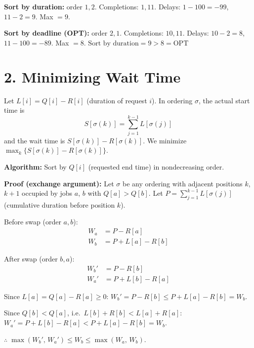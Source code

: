 \documentclass[11pt]{article}
\begin{document}
\textbf{Sort by duration:} order $1, 2$. Completions: $1, 11$. Delays: $1 - 100 = -99$, $11 - 2 = 9$. Max $= 9$.

\textbf{Sort by deadline (OPT):} order $2, 1$. Completions: $10, 11$. Delays: $10 - 2 = 8$, $11 - 100 = -89$. Max $= 8$. $\boxed{\text{Sort by duration} = 9 > 8 = \text{OPT}}$


\section*{2. Minimizing Wait Time}

Let $L[i] = Q[i] - R[i]$ (duration of request $i$). In ordering $\sigma$, the actual start time is
\[
S[\sigma(k)] = \sum_{j=1}^{k-1} L[\sigma(j)]
\]
and the wait time is $S[\sigma(k)] - R[\sigma(k)]$. We minimize $\max_k \big\{S[\sigma(k)] - R[\sigma(k)]\big\}$.

\textbf{Algorithm:} Sort by $Q[i]$ (requested end time) in nondecreasing order.

\begin{algorithm}[H]
\DontPrintSemicolon
{}
\end{algorithm}

\textbf{Proof (exchange argument):}
Let $\sigma$ be any ordering with adjacent positions $k$, $k{+}1$ occupied by jobs $a$, $b$ with $Q[a] > Q[b]$. Let $P = \sum_{j=1}^{k-1} L[\sigma(j)]$ (cumulative duration before position $k$).

Before swap (order $a, b$):
\begin{align*}
W_a &= P - R[a] \\
W_b &= P + L[a] - R[b]
\end{align*}

After swap (order $b, a$):
\begin{align*}
W_b' &= P - R[b] \\
W_a' &= P + L[b] - R[a]
\end{align*}

Since $L[a] = Q[a] - R[a] \ge 0$: \quad $W_b' = P - R[b] \le P + L[a] - R[b] = W_b$.

Since $Q[b] < Q[a]$, i.e.\ $L[b] + R[b] < L[a] + R[a]$: \quad $W_a' = P + L[b] - R[a] < P + L[a] - R[b] = W_b$.

$\therefore\; \max(W_b',\, W_a') \le W_b \le \max(W_a,\, W_b)$.
\end{document}
